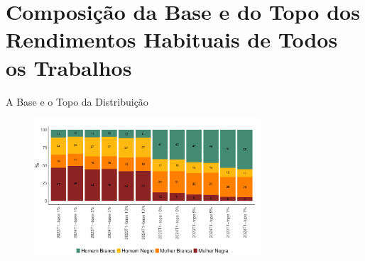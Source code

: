 \documentclass[10pt, xcolor=x11names,compress]{beamer}
\begin{document}
	\section{Composição da Base e do Topo dos Rendimentos Habituais de Todos os Trabalhos}
	\begin{frame}{A Base e o Topo da Distribuição}
		\begin{figure}
			\centering
			\includegraphics[width = 0.75\textwidth]{../figures_output/top_bottom.pdf}
		\end{figure}
	\end{frame}
	
	
	
	
\end{document}
